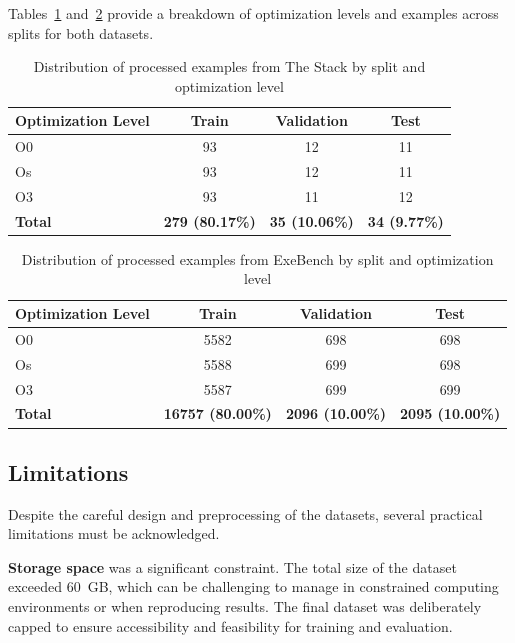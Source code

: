 \documentclass[../main.tex]{subfiles}
\begin{document}
Tables~\ref{tab:stack_dist} and~\ref{tab:exebench_dist} provide a breakdown of optimization levels and examples across splits for both datasets.

\vspace{1em}

\begin{table}[H]
\centering
\caption{Distribution of processed examples from The Stack by split and optimization level}
\label{tab:stack_dist}
\begin{tabular}{lccc}
\toprule
\textbf{Optimization Level} & \textbf{Train} & \textbf{Validation} & \textbf{Test} \\
\midrule
O0 & 93 & 12 & 11 \\
Os & 93 & 12 & 11 \\
O3 & 93 & 11 & 12 \\
\midrule
\textbf{Total} & \textbf{279 (80.17\%)} & \textbf{35 (10.06\%)} & \textbf{34 (9.77\%)} \\
\bottomrule
\end{tabular}
\end{table}

\vspace{1em}

\begin{table}[H]
\centering
\caption{Distribution of processed examples from ExeBench by split and optimization level}
\label{tab:exebench_dist}
\begin{tabular}{lccc}
\toprule
\textbf{Optimization Level} & \textbf{Train} & \textbf{Validation} & \textbf{Test} \\
\midrule
O0 & 5582 & 698 & 698 \\
Os & 5588 & 699 & 698 \\
O3 & 5587 & 699 & 699 \\
\midrule
\textbf{Total} & \textbf{16757 (80.00\%)} & \textbf{2096 (10.00\%)} & \textbf{2095 (10.00\%)} \\
\bottomrule
\end{tabular}
\end{table}


\subsection{Limitations}

Despite the careful design and preprocessing of the datasets, several practical limitations must be acknowledged.

\textbf{Storage space} was a significant constraint. The total size of the dataset exceeded 60~GB, which can be challenging to manage in constrained computing environments or when reproducing results. The final dataset was deliberately capped to ensure accessibility and feasibility for training and evaluation.
\end{document}
